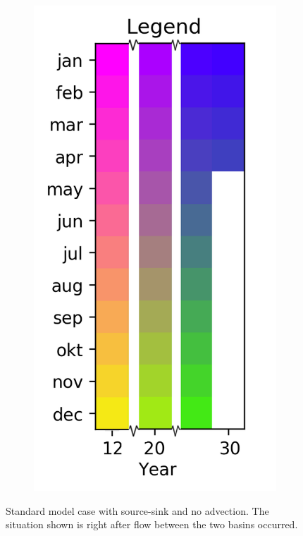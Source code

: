 \documentclass[twocolumn]{article}
\begin{document}
\begin{figure}
\begin{subfigure}[h]{0.23\textwidth}
\includegraphics[width=\textwidth,keepaspectratio]{12-30_reduced_legend.png}
\end{subfigure}\hfill
\caption{Standard model case with source-sink and no advection. The situation shown is right after flow between the two basins occurred.}
\label{fig:no_adv}
\end{figure}
\end{document}
